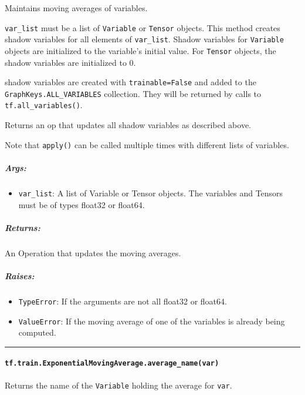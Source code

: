 Maintains moving averages of variables.

\texttt{var\_list} must be a list of \texttt{Variable} or
\texttt{Tensor} objects. This method creates shadow variables for all
elements of \texttt{var\_list}. Shadow variables for \texttt{Variable}
objects are initialized to the variable's initial value. For
\texttt{Tensor} objects, the shadow variables are initialized to 0.

shadow variables are created with \texttt{trainable=False} and added to
the \texttt{GraphKeys.ALL\_VARIABLES} collection. They will be returned
by calls to \texttt{tf.all\_variables()}.

Returns an op that updates all shadow variables as described above.

Note that \texttt{apply()} can be called multiple times with different
lists of variables.

\subparagraph{Args: }\label{args-20}

\begin{itemize}
\tightlist
\item
  \texttt{var\_list}: A list of Variable or Tensor objects. The
  variables and Tensors must be of types float32 or float64.
\end{itemize}

\subparagraph{Returns: }\label{returns-13}

An Operation that updates the moving averages.

\subparagraph{Raises: }\label{raises-9}

\begin{itemize}
\tightlist
\item
  \texttt{TypeError}: If the arguments are not all float32 or float64.
\item
  \texttt{ValueError}: If the moving average of one of the variables is
  already being computed.
\end{itemize}

\begin{center}\rule{0.5\linewidth}{\linethickness}\end{center}

\paragraph{\texorpdfstring{\texttt{tf.train.ExponentialMovingAverage.average\_name(var)}
}{tf.train.ExponentialMovingAverage.average\_name(var) }}\label{tf.train.exponentialmovingaverage.averageux5fnamevar}

Returns the name of the \texttt{Variable} holding the average for
\texttt{var}.

